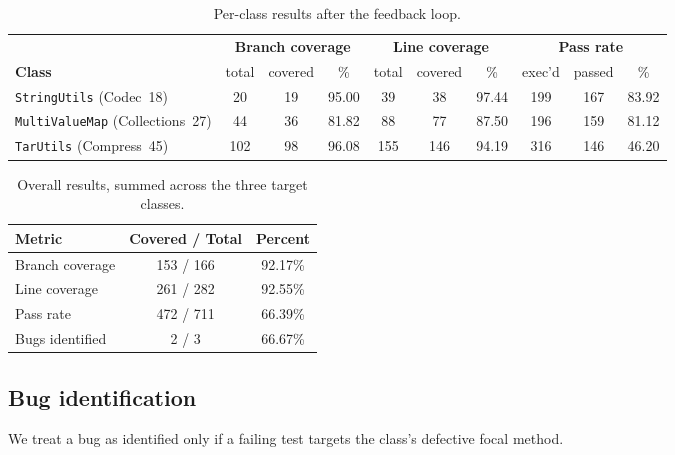 \documentclass[conference]{IEEEtran}
\begin{document}
\begin{table}[t]
\centering
\caption{Per-class results after the feedback loop.}
\label{tab:per-class}
\begin{tabularx}{\textwidth}{l c c c c c c c c c}
\toprule
& \multicolumn{3}{c}{\textbf{Branch coverage}}
& \multicolumn{3}{c}{\textbf{Line coverage}}
& \multicolumn{3}{c}{\textbf{Pass rate}} \\
\cmidrule(lr){2-4}\cmidrule(lr){5-7}\cmidrule(lr){8-10}
\textbf{Class} & total & covered & \% & total & covered & \% & exec'd & passed & \% \\
\midrule
\texttt{StringUtils} (Codec~18)         &  20 &  19 & 95.00 &  39 &  38 & 97.44 & 199 & 167 & 83.92 \\
\texttt{MultiValueMap} (Collections~27) &  44 &  36 & 81.82 &  88 &  77 & 87.50 & 196 & 159 & 81.12 \\
\texttt{TarUtils} (Compress~45)         & 102 &  98 & 96.08 & 155 & 146 & 94.19 & 316 & 146 & 46.20 \\
\bottomrule
\end{tabularx}
\end{table}

\begin{table}[t]
\centering
\caption{Overall results, summed across the three target classes.}
\label{tab:overall}
\begin{tabular}{lcc}
\toprule
Metric                  & Covered / Total & Percent \\
\midrule
Branch coverage         & 153 / 166 & 92.17\% \\
Line coverage           & 261 / 282 & 92.55\% \\
Pass rate               & 472 / 711 & 66.39\% \\
Bugs identified         & 2 / 3     & 66.67\% \\
\bottomrule
\end{tabular}
\end{table}

\subsection{Bug identification}
We treat a bug as identified only if a failing test targets the
class's defective focal method.
\end{document}
